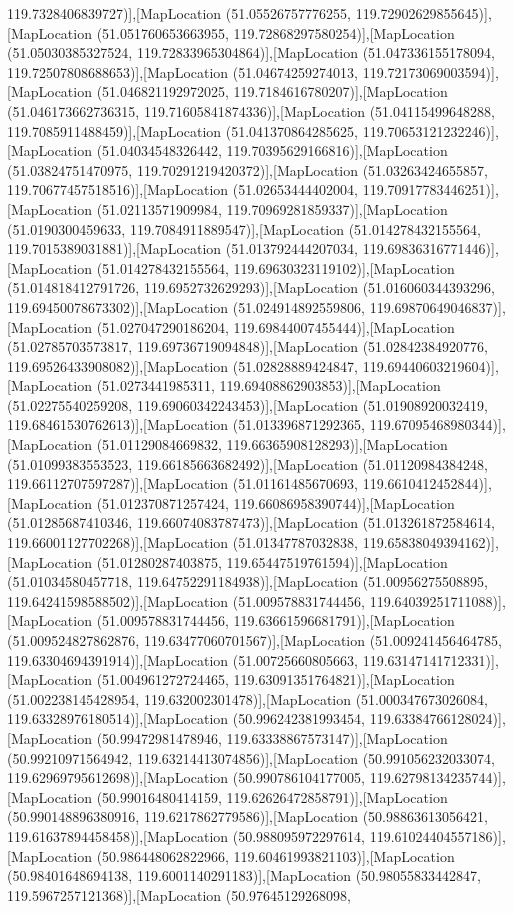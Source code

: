 119.7328406839727)],[MapLocation (51.05526757776255, 119.72902629855645)],[MapLocation (51.051760653663955, 119.72868297580254)],[MapLocation (51.05030385327524, 119.72833965304864)],[MapLocation (51.047336155178094, 119.72507808688653)],[MapLocation (51.04674259274013, 119.72173069003594)],[MapLocation (51.046821192972025, 119.7184616780207)],[MapLocation (51.046173662736315, 119.71605841874336)],[MapLocation (51.04115499648288, 119.7085911488459)],[MapLocation (51.041370864285625, 119.70653121232246)],[MapLocation (51.04034548326442, 119.70395629166816)],[MapLocation (51.03824751470975, 119.70291219420372)],[MapLocation (51.03263424655857, 119.70677457518516)],[MapLocation (51.02653444402004, 119.70917783446251)],[MapLocation (51.02113571909984, 119.70969281859337)],[MapLocation (51.0190300459633, 119.7084911889547)],[MapLocation (51.014278432155564, 119.7015389031881)],[MapLocation (51.013792444207034, 119.69836316771446)],[MapLocation (51.014278432155564, 119.69630323119102)],[MapLocation (51.014818412791726, 119.6952732629293)],[MapLocation (51.016060344393296, 119.69450078673302)],[MapLocation (51.024914892559806, 119.69870649046837)],[MapLocation (51.027047290186204, 119.69844007455444)],[MapLocation (51.02785703573817, 119.69736719094848)],[MapLocation (51.02842384920776, 119.69526433908082)],[MapLocation (51.02828889424847, 119.69440603219604)],[MapLocation (51.0273441985311, 119.69408862903853)],[MapLocation (51.02275540259208, 119.69060342243453)],[MapLocation (51.01908920032419, 119.68461530762613)],[MapLocation (51.013396871292365, 119.67095468980344)],[MapLocation (51.01129084669832, 119.66365908128293)],[MapLocation (51.01099383553523, 119.66185663682492)],[MapLocation (51.01120984384248, 119.66112707597287)],[MapLocation (51.01161485670693, 119.6610412452844)],[MapLocation (51.012370871257424, 119.66086958390744)],[MapLocation (51.01285687410346, 119.66074083787473)],[MapLocation (51.013261872584614, 119.66001127702268)],[MapLocation (51.01347787032838, 119.65838049394162)],[MapLocation (51.01280287403875, 119.65447519761594)],[MapLocation (51.01034580457718, 119.64752291184938)],[MapLocation (51.00956275508895, 119.64241598588502)],[MapLocation (51.009578831744456, 119.64039251711088)],[MapLocation (51.009578831744456, 119.63661596681791)],[MapLocation (51.009524827862876, 119.63477060701567)],[MapLocation (51.009241456464785, 119.63304694391914)],[MapLocation (51.00725660805663, 119.63147141712331)],[MapLocation (51.004961272724465, 119.63091351764821)],[MapLocation (51.002238145428954, 119.632002301478)],[MapLocation (51.000347673026084, 119.63328976180514)],[MapLocation (50.996242381993454, 119.63384766128024)],[MapLocation (50.99472981478946, 119.63338867573147)],[MapLocation (50.99210971564942, 119.63214413074856)],[MapLocation (50.991056232033074, 119.62969795612698)],[MapLocation (50.990786104177005, 119.62798134235744)],[MapLocation (50.99016480414159, 119.62626472858791)],[MapLocation (50.990148896380916, 119.6217862779586)],[MapLocation (50.98863613056421, 119.61637894458458)],[MapLocation (50.988095972297614, 119.61024404557186)],[MapLocation (50.986448062822966, 119.60461993821103)],[MapLocation (50.98401648694138, 119.6001140291183)],[MapLocation (50.98055833442847, 119.5967257121368)],[MapLocation (50.97645129268098, 